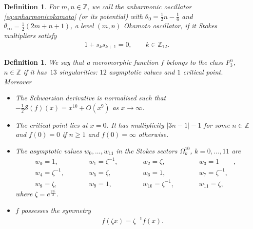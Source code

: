 \documentclass[pdftex]{sigma}
\numberwithin{equation}{section}
\newtheorem{Def}[thm]{Definition}
\newtheorem*{def*}{Definition}
\newcommand{\bb}[1]{\mathbb{ #1 }}
\begin{document}
\begin{def*}For $m,n\in\mathbb{Z}$, we call the anharmonic oscillator \eqref{eq:anharmonicokamoto} (or its potential) with $\theta_0=\tfrac{1}{2}n-\tfrac{1}{6}$ and $\theta_\infty=\tfrac{1}{2}(2m+n+1)$, a level $(m,n)$ Okamoto oscillator, if it Stokes multipliers satisfy
	\begin{gather}\label{eq:okamotostokes}
	1+s_ks_{k+1}=0, \qquad k\in\mathbb{Z}_{12}.
	\end{gather}
\end{def*}

\begin{Def}\label{def:F3} We say that a meromorphic function $f$ belongs to the class $F_3^n$, $n \in \bb{Z}$ if it has~$13$ singularities: $12$ asymptotic values and $1$ critical point. Moreover
\begin{itemize}\itemsep=0pt
\item The Schwarzian derivative is normalised such that $-\frac12{\mathcal{S}}(f)(x)=x^{10}+O(x^9)$ as $x \to \infty$.
\item The critical point lies at $x=0$. It has multiplicity $|3n-1|-1$ for some $n \in \bb{Z}$ and $f(0)=0$ if $n\geq 1$ and $f(0)=\infty$ otherwise.
\item The asymptotic values $w_0,\dots,w_{11}$ in the Stokes sectors $\Omega_k^{10}$, $k =0,\dots, 11$ are
\begin{subequations}\label{eq:asymptoticokamoto}
	\begin{alignat}{5}
& w_0 =1,\qquad &&w_1 =\zeta^{-1},\qquad && w_2 =\zeta, \qquad && w_3=1&,\\
& w_4 =\zeta^{-1},\qquad && w_5 =\zeta,\qquad && w_6=1, \qquad && w_7 =\zeta^{-1}, & \\
& w_8 =\zeta,\qquad && w_9 =1,\qquad && w_{10} =\zeta^{-1}, \qquad && w_{11} =\zeta, &	
	\end{alignat}
\end{subequations}
	where $\zeta=e^{\frac{2\pi i}{3}}$.
	\item $f$ possesses the symmetry
	\begin{gather}\label{eq:symmetryokamoto}
	f(\zeta x)=\zeta^{-1}f(x).
	\end{gather}
\end{itemize}
\end{Def}
\end{document}
